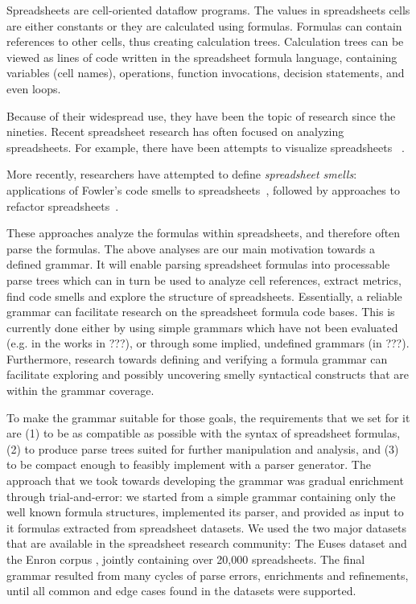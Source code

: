 \documentclass[conference]{IEEEtran}
\begin{document}
Spreadsheets are cell-oriented dataflow programs. The values in spreadsheets cells are either constants or they are calculated using formulas. Formulas can contain references to other cells, thus creating calculation trees. Calculation trees can be viewed as lines of code written in the spreadsheet formula language, containing variables (cell names), operations, function invocations, decision statements, and even loops. 

Because of their widespread use, they have been the topic of research since the nineties\cite{DBLP:journals/sigplan/BellP93}. Recent spreadsheet research has often focused on analyzing spreadsheets. For example, there have been attempts to visualize spreadsheets ~\cite{DBLP:conf/icse/HermansPD11, Shio1999}. 

More recently, researchers have attempted to define \emph{spreadsheet smells}: applications of Fowler's code smells to spreadsheets~\cite{DBLP:conf/icse/HermansPD12, DBLP:conf/icsm/Hermans212}, followed by approaches to refactor spreadsheets~\cite{hermans2014bumblebee,badame2012refactoring}.

These approaches analyze the formulas within spreadsheets, and therefore often parse the formulas. The above analyses are our main motivation towards a defined grammar. It will enable parsing spreadsheet formulas into processable parse trees which can in turn be used to analyze cell references, extract metrics, find code smells and explore the structure of spreadsheets. Essentially, a reliable grammar can facilitate research on the spreadsheet formula code bases. This is currently done either by using simple grammars which have not been evaluated (e.g. in the works in ???), or through some implied, undefined grammars (in ???). Furthermore, research towards defining and verifying a formula grammar can facilitate exploring and possibly uncovering smelly syntactical constructs that are within the grammar coverage.

To make the grammar suitable for those goals, the requirements that we set for it are (1) to be as compatible as possible with the syntax of spreadsheet formulas, (2) to produce parse trees suited for further manipulation and analysis, and (3) to be compact enough to feasibly implement with a parser generator. The approach that we took towards developing the grammar was gradual enrichment through trial-and-error: we started from a simple grammar containing only the well known formula structures, implemented its parser, and provided as input to it formulas extracted from spreadsheet datasets. We used the two major datasets that are available in the spreadsheet research community: The Euses dataset \cite{euses} and the Enron corpus \cite{enron}, jointly containing over 20,000 spreadsheets. The final grammar resulted from many cycles of parse errors, enrichments and refinements, until all common and edge cases found in the datasets were supported.
\end{document}
